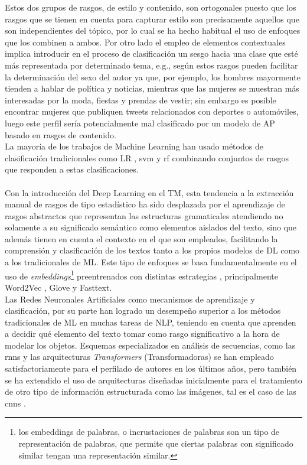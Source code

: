 Estos dos grupos de rasgos, de estilo y contenido, son ortogonales puesto que los rasgos que se tienen en cuenta para capturar estilo son precisamente aquellos que son independientes del tópico, por lo cual se ha hecho habitual el uso de enfoques que los combinen a ambos. Por otro lado el empleo de elementos contextuales implica introducir en el proceso de clasificación un sesgo hacia una clase que esté más representada por determinado tema, e.g., según \citep{schler2006effects} estos rasgos pueden facilitar la determinación del sexo del autor ya que, por ejemplo, los hombres mayormente tienden a hablar de política y noticias, mientras que las mujeres se muestran más interesadas por la moda, fiestas y prendas de vestir; sin embargo es posible encontrar mujeres que publiquen tweets relacionados con deportes o automóviles, luego este perfil sería potencialmente mal clasificado por un modelo de AP basado en rasgos de contenido.
\\
La mayoría de los trabajos de Machine Learning han usado métodos de clasificación tradicionales como \ac{LR} \citep{DBLP:conf/clef/Valencia-Valencia19}, \ac{svm} \citep{DBLP:conf/clef/Pizarro19}  y \ac{rf} \citep{DBLP:conf/clef/Johansson19} combinando conjuntos de rasgos que responden a estas clasificaciones.
\\
\\
 Con la introducción del Deep Learning en el TM, esta tendencia a la extracción manual de rasgos de tipo estadístico ha sido desplazada por el aprendizaje de rasgos abstractos que representan las estructuras gramaticales atendiendo no solamente a su significado semántico como elementos aislados del texto, sino que además tienen en cuenta el contexto en el que son empleados, facilitando la comprensión y clasificación de los textos tanto a los propios modelos de DL como a los tradicionales de ML. Este tipo de enfoques se basa fundamentalmente en el uso de \textit{embeddings}\footnote{ los embeddings de palabras, o incrustaciones de palabras son un tipo de representación de palabras, que permite que ciertas palabras con significado similar tengan una representación similar.} preentrenados con distintas estrategias \citep{DBLP:conf/clef/JooH19,DBLP:conf/clef/Lopez-Santillan19}, principalmente Word2Vec \citep{DBLP:conf/nips/MikolovSCCD13}, Glove\citep{pennington2014glove} y Fasttext\citep{bojanowski2016enriching}.
 \\
 Las Redes Neuronales Artificiales como mecanismos de aprendizaje y clasificación, por su parte han logrado un desempeño superior a los métodos tradicionales de ML en muchas tareas de NLP, teniendo en cuenta que aprenden a decidir qué elemento del texto tomar como rasgo significativo a la hora de modelar los objetos. Esquemas especializados en análisis de secuencias, como las \acp{rnn} \citep{DBLP:conf/clef/DiasP19,bakhteev:2020} y las arquitecturas \textit{Transformers} (Transformadoras) \citep{iyer:2020,baruah:2020} se han empleado satisfactoriamente para el perfilado de autores en los últimos años, pero también se ha extendido el uso de arquitecturas diseñadas inicialmente para el tratamiento de otro tipo de información estructurada como las imágenes, tal es el caso de las \acp{cnn} \citep{DBLP:conf/clef/PetrikC19,DBLP:conf/clef/Lopez-Santillan19}.
